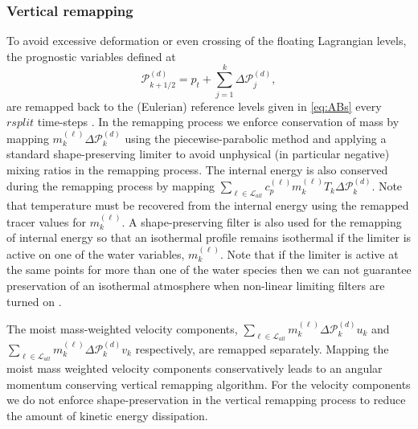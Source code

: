 \documentclass{agujournal}
\begin{document}
{\subsubsection{Vertical remapping}\label{sec:verticalRemappin}
To avoid excessive deformation or even crossing of the floating Lagrangian levels, the prognostic variables defined at
\begin{equation}
\mathcal{P}^{(d)}_{k+1/2}=p_t+\sum_{j=1}^{k}\Delta \mathcal{P}^{(d)}_j,
\end{equation}
are remapped back to the (Eulerian) reference levels given in \eqref{eq:ABs} every $rsplit$ time-steps \citep{L2004MWR}. In the remapping process we enforce conservation of mass by mapping $m^{(\ell)}_k\Delta \mathcal{P}^{(d)}_k$ using the piecewise-parabolic method \cite[PPM; ][]{CW1984JCP} and applying a standard shape-preserving limiter to avoid unphysical (in particular negative) mixing ratios in the remapping process. The internal energy is also conserved during the remapping process by mapping $\sum_{\ell \in \mathcal{L}_{all}} c_p^{(\ell)} m_k^{(\ell)}T_k \Delta \mathcal{P}^{(d)}_k$. Note that temperature must be recovered from the internal energy using the remapped tracer values for $m^{(\ell)}_k$. A shape-preserving filter is also used for the remapping of internal energy so that an isothermal profile remains isothermal if the limiter is active on one of the water variables, $m^{(\ell)}_k$. Note that if the limiter is active at the same points for more than one of the water species then we can not guarantee preservation of an isothermal atmosphere when non-linear limiting filters are turned on \citep[see, e.g., Section 2.5 in ][]{LT2011QJR}.

The moist mass-weighted velocity components, $\sum_{\ell \in \mathcal{L}_{all}} m^{(\ell)}_k \Delta \mathcal{P}^{(d)}_k u_k$ and $\sum_{\ell \in \mathcal{L}_{all}} m_k^{(\ell)} \Delta \mathcal{P}^{(d)}_k v_k$ respectively, are remapped separately. Mapping the moist mass weighted velocity components conservatively leads to an angular momentum conserving vertical remapping algorithm. For the velocity components we do not enforce shape-preservation in the vertical remapping process to reduce the amount of kinetic energy dissipation.
}
\end{document}
